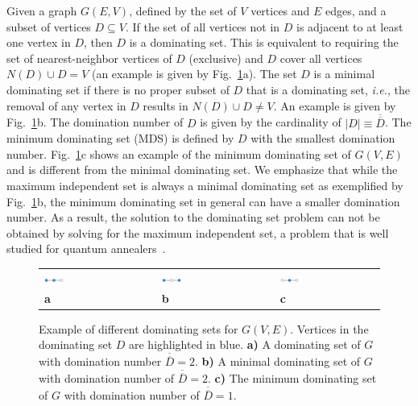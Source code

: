 \documentclass[prd,twocolumn,tightenlines,preprintnumbers,showpacs,superscriptaddress,notitlepage,nofootinbib,eqsecnum,
floatfix,longbibliography,aps,10pt]{revtex4-2}
\begin{document}
Given a graph $G(E,V)$, defined by the set of $V$ vertices and $E$ edges, and a subset of vertices $D \subseteq V$. If the set of all vertices not in $D$ is adjacent to at least one vertex in $D$, then $D$ is a dominating set. This is equivalent to requiring the set of nearest-neighbor vertices of $D$ (exclusive) and $D$ cover all vertices $N(D) \cup D = V$ (an example is given by Fig.~\ref{fig:dominating_sets}a). The set $D$ is a minimal dominating set if there is no proper subset of $D$ that is a dominating set, {\it{i.e.}}, the removal of any vertex in $D$ results in $N(D) \cup D  \neq V$. An example is given by Fig.~\ref{fig:dominating_sets}b. The domination number of $D$ is given by the cardinality of $|D| \equiv \overline{\overline{D}}$. The minimum dominating set (MDS) is defined by $D$ with the smallest domination number. Fig.~\ref{fig:dominating_sets}c shows an example of the minimum dominating set of $G(V, E)$ and is different from the minimal dominating set. We emphasize that while the maximum independent set is always a minimal dominating set as exemplified by Fig.~\ref{fig:dominating_sets}b, the minimum dominating set in general can have a smaller domination number. As a result, the solution to the dominating set problem can not be obtained by solving for the maximum independent set, a problem that is well studied for quantum annealers~\cite{}.

\begin{figure}
	\centering
	\begin{tabular}{p{}p{}p{}p{}p{}}
	\includegraphics[width=0.2\textwidth]{./new_figures/MDS_mds0.pdf}
&&
	\includegraphics[width=0.2\textwidth]{./new_figures/MDS_mds1.pdf}
&&
	\includegraphics[width=0.2\textwidth]{./new_figures/MDS_mds2.pdf}\\
	\centering\bf{a} && \centering\bf{b} && \centering\bf{c}
	\end{tabular}
	\caption{Example of different dominating sets for $G(V, E)$. Vertices in the dominating set $D$ are highlighted in blue. {\bf{a)}} A dominating set of $G$ with domination number $\overline{\overline{D}} = 2$. {\bf{b)}} A minimal dominating set of $G$ with domination number of $\overline{\overline{D}} = 2$. {\bf{c)}} The minimum dominating set of $G$ with domination number of $\overline{\overline{D}} = 1$.}
	\label{fig:dominating_sets}
\end{figure}
\end{document}
